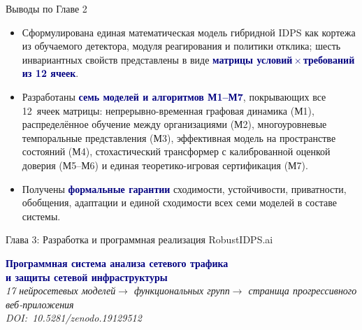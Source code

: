 \documentclass[10pt,aspectratio=169]{beamer}
\newcommand{\bn}[1]{\textcolor{navy}{\textbf{#1}}}
\begin{document}
\begin{frame}{Выводы по Главе 2}
\small
\begin{itemize}\setlength\itemsep{4pt}
\item Сформулирована единая математическая модель гибридной
IDPS как кортежа из обучаемого детектора, модуля
реагирования и политики отклика; шесть инвариантных свойств
представлены в виде \bn{матрицы условий\,$\times$\,требований
из 12 ячеек}.
\item Разработаны \bn{семь моделей и алгоритмов М1--М7},
покрывающих все 12~ячеек матрицы: непрерывно-временная
графовая динамика (М1), распределённое обучение между
организациями (М2), многоуровневые темпоральные
представления (М3), эффективная модель на пространстве
состояний (М4), стохастический трансформер с калиброванной
оценкой доверия (М5--М6) и единая теоретико-игровая
сертификация (М7).
\item Получены \bn{формальные гарантии} сходимости,
устойчивости, приватности, обобщения, адаптации и единой
сходимости всех семи моделей в составе системы.
\end{itemize}
\end{frame}

\begin{frame}{Глава 3: Разработка и программная реализация RobustIDPS.ai}
\vspace{1.5cm}
\begin{center}
{\Large\bn{Программная система анализа сетевого трафика\\
и защиты сетевой инфраструктуры}}\\[1cm]

\textit{17 нейросетевых моделей\;$\to$ функциональных
групп\;$\to$ страница прогрессивного веб-приложения}\\[0.4cm]

\textit{DOI:~10.5281/zenodo.19129512}
\end{center}
\end{frame}
\end{document}
